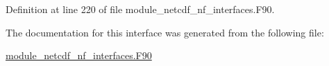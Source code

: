 Definition at line 220 of file module\+\_\+netcdf\+\_\+nf\+\_\+interfaces.\+F90.



The documentation for this interface was generated from the following file\+:\begin{DoxyCompactItemize}
\item 
\hyperlink{module__netcdf__nf__interfaces_8F90}{module\+\_\+netcdf\+\_\+nf\+\_\+interfaces.\+F90}\end{DoxyCompactItemize}
